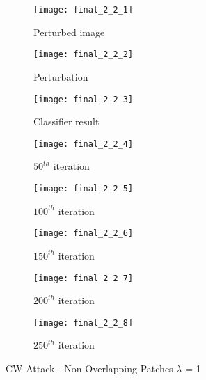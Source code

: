 \documentclass[11pt]{article}
\begin{document}
\begin{figure}[H]
\begin{subfigure}{.22\textwidth}
  \centering
  \texttt{[image: final\_2\_2\_1]}
  \caption{Perturbed image}
  \label{fig:}
\end{subfigure}
\begin{subfigure}{.22\textwidth}
  \centering
  \texttt{[image: final\_2\_2\_2]}
  \caption{Perturbation}
  \label{fig:}
\end{subfigure}
\begin{subfigure}{.22\textwidth}
  \centering
  \texttt{[image: final\_2\_2\_3]}
  \caption{Classifier result}
  \label{fig:}
\end{subfigure}
\begin{subfigure}{.22\textwidth}
  \centering
  \texttt{[image: final\_2\_2\_4]}
  \caption{$50^{th}$ iteration}
  \label{fig:}
\end{subfigure}

\begin{subfigure}{.22\textwidth}
  \centering
  \texttt{[image: final\_2\_2\_5]}
  \caption{$100^{th}$ iteration}
  \label{fig:}
\end{subfigure}
\begin{subfigure}{.22\textwidth}
  \centering
  \texttt{[image: final\_2\_2\_6]}
  \caption{$150^{th}$ iteration}
  \label{fig:}
\end{subfigure}
\begin{subfigure}{.22\textwidth}
  \centering
  \texttt{[image: final\_2\_2\_7]}
  \caption{$200^{th}$ iteration}
  \label{fig:}
\end{subfigure}
\begin{subfigure}{.22\textwidth}
  \centering
  \texttt{[image: final\_2\_2\_8]}
  \caption{$250^{th}$ iteration}
  \label{fig:}
\end{subfigure}

\caption{CW Attack - Non-Overlapping Patches $\lambda$ = 1}
\label{fig:}
\end{figure}
\end{document}
